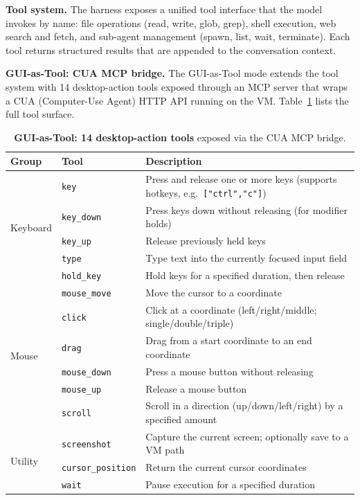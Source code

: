 \documentclass{llmxive}
\begin{document}
\noindent \textbf{Tool system.}
The harness exposes a unified tool interface that the model invokes by name: file operations (read, write, glob, grep), shell execution, web search and fetch, and sub-agent management (spawn, list, wait, terminate). Each tool returns structured results that are appended to the conversation context.

\noindent \textbf{GUI-as-Tool: CUA MCP bridge.}
The GUI-as-Tool mode extends the tool system with 14 desktop-action tools exposed through an MCP server that wraps a CUA (Computer-Use Agent) HTTP API running on the VM. Table~\ref{tab:gui-tools} lists the full tool surface.

\begin{table}[!htbp]
\centering
\small
\begin{tabular}{@{}llp{7.2cm}@{}}
\toprule
Group & Tool & Description \\
\midrule
\multirow{5}{*}{Keyboard}
 & \texttt{key} & Press and release one or more keys (supports hotkeys, e.g.\ \texttt{["ctrl","c"]}) \\
 & \texttt{key\_down} & Press keys down without releasing (for modifier holds) \\
 & \texttt{key\_up} & Release previously held keys \\
 & \texttt{type} & Type text into the currently focused input field \\
 & \texttt{hold\_key} & Hold keys for a specified duration, then release \\
\midrule
\multirow{6}{*}{Mouse}
 & \texttt{mouse\_move} & Move the cursor to a coordinate \\
 & \texttt{click} & Click at a coordinate (left/right/middle; single/double/triple) \\
 & \texttt{drag} & Drag from a start coordinate to an end coordinate \\
 & \texttt{mouse\_down} & Press a mouse button without releasing \\
 & \texttt{mouse\_up} & Release a mouse button \\
 & \texttt{scroll} & Scroll in a direction (up/down/left/right) by a specified amount \\
\midrule
\multirow{3}{*}{Utility}
 & \texttt{screenshot} & Capture the current screen; optionally save to a VM path \\
 & \texttt{cursor\_position} & Return the current cursor coordinates \\
 & \texttt{wait} & Pause execution for a specified duration \\
\bottomrule
\end{tabular}
\caption{\textbf{GUI-as-Tool: 14 desktop-action tools} exposed via the CUA MCP bridge.}
\label{tab:gui-tools}
\end{table}
\end{document}
